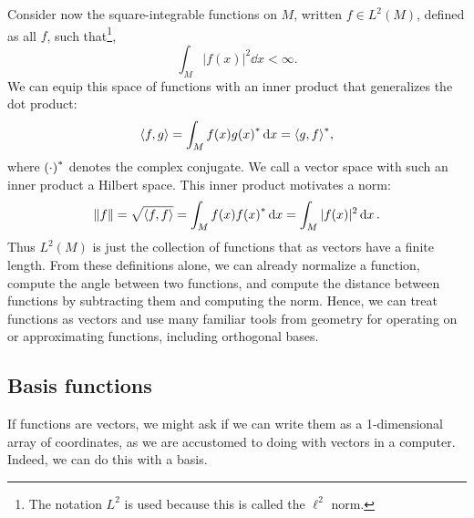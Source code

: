 \documentclass[../../main.tex]{subfiles}
\begin{document}
\begin{refsection}
	Consider now the square-integrable functions on $M$, written $f \in L^2(M)$, defined as all $f$, such that\footnote{The notation $L^2$ is used because this is called the $\ell^2$ norm.},
	$$\int_M |f(x)|^2 \dd{x} < \infty.$$
	We can equip this space of functions with an inner product that generalizes the dot product\footnotemark:
	$$\left\langle f, g \right\rangle = \int_M f(x) {g(x)}^* \dd{x} = {\left\langle g, f \right\rangle}^*,$$
	where ${(\cdot)}^*$ denotes the complex conjugate.
	We call a vector space with such an inner product a Hilbert space\supercite{kennedyHilbertSpaceMethods2013}.
	This inner product motivates a norm:
	$$\norm{f} = \sqrt{\left\langle f, f \right\rangle} = \int_M f(x) {f(x)}^* \dd{x} = \int_M |f(x)|^2 \dd{x}.$$
	Thus $L^2(M)$ is just the collection of functions that as vectors have a finite length.
	From these definitions alone, we can already normalize a function, compute the angle between two functions, and compute the distance between functions by subtracting them and computing the norm.
	Hence, we can treat functions as vectors and use many familiar tools from geometry for operating on or approximating functions, including orthogonal bases.

	\subsection{Basis functions}

	If functions are vectors, we might ask if we can write them as a 1-dimensional array of coordinates, as we are accustomed to doing with vectors in a computer.
	Indeed, we can do this with a basis.


\end{refsection}
\end{document}
